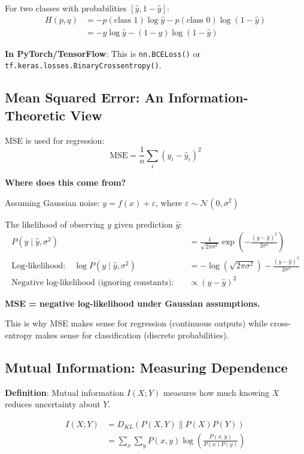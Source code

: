 \documentclass[11pt,oneside]{book}
\begin{document}
For two classes with probabilities $[\hat{y}, 1-\hat{y}]$:
\begin{align*}
H(p, q) &= -p(\text{class 1}) \log \hat{y} - p(\text{class 0}) \log(1-\hat{y}) \\
        &= -y \log \hat{y} - (1-y) \log(1-\hat{y})
\end{align*}

\textbf{In PyTorch/TensorFlow}: This is \texttt{nn.BCELoss()} or \texttt{tf.keras.losses.BinaryCrossentropy()}.

\subsection{Mean Squared Error: An Information-Theoretic View}

MSE is used for regression:
\[
\text{MSE} = \frac{1}{n} \sum_{i} (y_i - \hat{y}_i)^2
\]

\textbf{Where does this come from?}

Assuming Gaussian noise: $y = f(x) + \varepsilon$, where $\varepsilon \sim \mathcal{N}(0, \sigma^2)$

The likelihood of observing $y$ given prediction $\hat{y}$:
\begin{align*}
P(y \mid \hat{y}, \sigma^2) &= \frac{1}{\sqrt{2\pi\sigma^2}} \exp\left(-\frac{(y-\hat{y})^2}{2\sigma^2}\right) \\
\text{Log-likelihood:} \quad \log P(y \mid \hat{y}, \sigma^2) &= -\log(\sqrt{2\pi\sigma^2}) - \frac{(y-\hat{y})^2}{2\sigma^2} \\
\text{Negative log-likelihood (ignoring constants):} \quad &\propto (y-\hat{y})^2
\end{align*}

\textbf{MSE = negative log-likelihood under Gaussian assumptions.}

This is why MSE makes sense for regression (continuous outputs) while cross-entropy makes sense for classification (discrete probabilities).

\subsection{Mutual Information: Measuring Dependence}

\textbf{Definition}: Mutual information $I(X; Y)$ measures how much knowing $X$ reduces uncertainty about $Y$.

\begin{align*}
I(X; Y) &= D_{KL}(P(X,Y) \| P(X)P(Y)) \\
        &= \sum_{x} \sum_{y} P(x,y) \log\left(\frac{P(x,y)}{P(x)P(y)}\right)
\end{align*}
\end{document}
